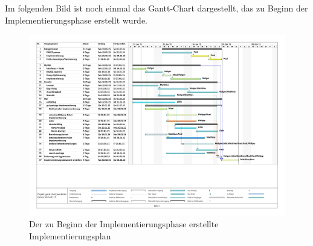 Im folgenden Bild ist noch einmal das Gantt-Chart dargestellt, das zu Beginn der Implementierungsphase erstellt wurde.

\begin{figure}[H]
	\centering
	\includegraphics[width=\textwidth]{../Gantt/Implementierungsplan.pdf}
	\caption{Der zu Beginn der Implementierungsphase erstellte Implementierungsplan}
\end{figure}

